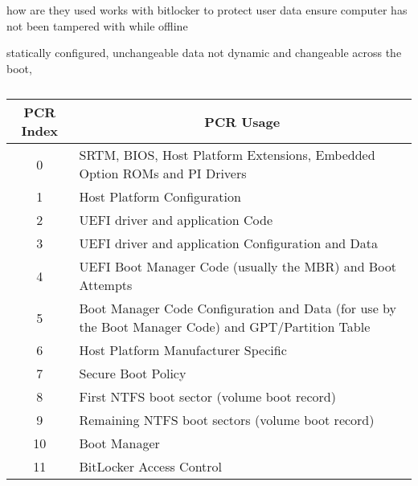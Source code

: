 how are they used
works with bitlocker to protect user data
ensure computer has not been tampered with while offline

statically configured, unchangeable data
not dynamic and changeable across the boot,
\cite{tianocore-trusted-boot-chain}

\begin{table}
    \centering
    \begin{tabular}{ c|p{30em}  }
        \acs{PCR} Index & \multicolumn{1}{c}{\acs{PCR} Usage}                                                                      \\
        \hline
        0               & SRTM, BIOS, Host Platform Extensions, Embedded Option ROMs and PI Drivers                                \\
        \hline
        1               & Host Platform Configuration                                                                              \\
        \hline
        2               & UEFI driver and application Code                                                                         \\
        \hline
        3               & UEFI driver and application Configuration and Data                                                       \\
        \hline
        4               & UEFI Boot Manager Code (usually the MBR) and Boot Attempts                                               \\
        \hline
        5               & Boot Manager Code Configuration and Data (for use by the Boot Manager Code) and \ac{GPT}/Partition Table \\
        \hline
        6               & Host Platform Manufacturer Specific                                                                      \\
        \hline
        7               & Secure Boot Policy                                                                                       \\
        \hline
        8               & First \ac{NTFS} boot sector (volume boot record)                                                         \\
        \hline
        9               & Remaining \ac{NTFS} boot sectors (volume boot record)                                                    \\
        \hline
        10              & Boot Manager                                                                                             \\
        \hline
        11              & BitLocker Access Control                                                                                 \\
    \end{tabular}

    \caption{\cite{tcg-pc-client-platform-firmware-profile-spec, windows-internals-6-part2}}
\end{table}


